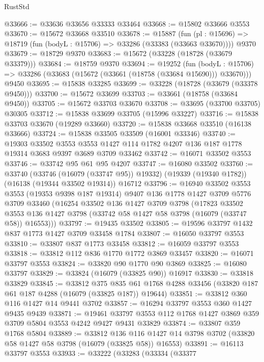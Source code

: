 \begin{lexlean}{RustStd}
\begin{coremodule}
@33666 := @33636 @33656 @33333 @33464
@33668 := @15802 @33666 @3553
@33670 := @15672 @33668 @33510
@33678 := @15887
    (fun (pl : @15696) => @18719 (fun (bodyL : @15706) => @33286 (@33383 (@33663 @33670))))
    @9370
@33679 := @18729 @9370
@33683 := @15672 (@33228 (@18728 (@33679 @33379)))
@33684 := @18759 @9370
@33694 := @19252
    (fun (bodyL : @15706) => @33286 (@33683 (@15672 (@33661 (@18758 (@33684 @15690))) @33670)))
    @9450
@33695 := @15838 @33285
@33699 := @33228 (@18728 (@33679 (@33378 @9450)))
@33700 := @15672 @33699
@33703 := @33661 (@18758 (@33684 @9450))
@33705 := @15672 @33703 @33670
@33708 := @33695 (@33700 @33705) @30305
@33712 := @15838 @33699 @33705 (@15996 @33227)
@33716 := @15838 @33703 @33670 (@19289 @33660)
@33720 := @15838 @33668 @33510 (@16138 @33666)
@33724 := @15838 @33505 @33509 (@16001 @33346)
@33740 := @19303
    @33502
    @3553
    @3553
    @1427
    @114
    @1782
    @4207
    @136
    @187
    @1778
    @19314
    @3683
    @9397
    @3689
    @3709
    @33462
@33742 := @16071 @33502 @3553
@33746 := @33742 @95 @61 @95 @4207
@33747 := @16080 @33502
@33760 := @33740
    (@33746 (@16079 (@33747 @95)) @19332)
    (@19339 (@19340 @1782))
    (@16138 (@19344 @33502 @19314))
    @16712
@33796 := @16940
    @33502
    @3553
    @3553
    (@19353 @9398 @187 @19314)
    @9407
    @136
    @1778
    @1427
    @3709
    @5776
    @3709
    @33460
    (@16254
      @33502
      @136
      @1427
      @3709
      @3798
      (@17823
        @33502
        @3553
        @136
        @1427
        @3798
        (@33742 @58 @1427 @58 @3798 (@16079 (@33747 @58)) @16553)))
@33797 := @19435 @33502
@33805 := @19596 @33797 @1432 @837 @1773 @1427 @3709 @33458 @1784
@33807 := @16050 @33797 @3553
@33810 := @33807 @837 @1773 @33458
@33812 := @16059 @33797 @3553
@33818 := @33812 @112 @836 @1770 @1772 @3869 @33457
@33820 := @16071 @33797 @3553
@33824 := @33820 @90 @1770 @90 @3869
@33825 := @16080 @33797
@33829 := @33824 (@16079 (@33825 @90)) @16917
@33830 := @33818 @33829
@33845 := @33812
    @375
    @835
    @61
    @1768
    @4288
    @33456
    (@33820 @187 @61 @187 @4288 (@16079 (@33825 @187)) @19644)
@33851 := @33812 @360 @116 @1427 @14 @9441 @3702
@33857 := @16294 @33797 @3553 @360 @1427 @9435 @9439
@33871 := @19461 @33797 @3553 @112 @1768 @1427 @3869 @359 @3709 @5804 @3553 @4242 @9427 @9431 @33829
@33874 := @33807 @359 @1768 @5804
@33889 := @33812
    @136
    @116
    @1427
    @14
    @3798
    @3702
    (@33820 @58 @1427 @58 @3798 (@16079 (@33825 @58)) @16553)
@33891 := @16113 @33797 @3553
@33933 := @33222
    (@33283
      (@33334
        (@33377

\end{coremodule}
\end{lexlean}
